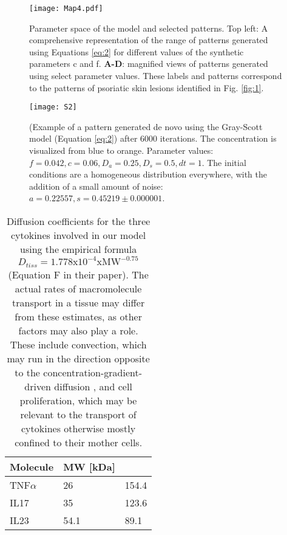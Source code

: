 \begin{figure}[ht]
	\centering
	\texttt{[image: Map4.pdf]}
	\caption[Parameter space of the model and selected patterns]{Parameter space of the model and selected patterns. Top left: A comprehensive representation of the range of patterns generated using Equations \ref{eq:2} for different values of the synthetic parameters c and f. \textbf{A-D}: magnified views of patterns generated using select parameter values. These labels and patterns correspond to the patterns of psoriatic skin lesions identified in Fig. \ref{fig:1}.}
	\label{fig:3}
\end{figure}

\begin{figure}[hb]
  \centering
  \texttt{[image: S2]}
  \caption[Example of a pattern generated de novo using the Gray-Scott model]{(Example of a pattern generated de novo using the Gray-Scott model (Equation \ref{eq:2}) after 6000 iterations. The concentration is visualized from blue to orange. Parameter values: $f=0.042, c=0.06, D_a=0.25, D_s=0.5, dt=1$. The initial conditions are a homogeneous distribution everywhere, with the addition of a small amount of noise: $a=0.22557, s=0.45219±0.000001$.}
  \label{fig:S2}
\end{figure}

\begin{table}[ht]
	\centering
	\begin{tabular}{|l|l|l|}
	\hline
	\textbf{Molecule}  & \textbf{MW [kDa]} & \bm{$D_{tiss}[\mu m^2 / s]$} \\ \hline 
	TNF$\alpha$ & 26   & 154.4 \\ \hline
	IL17        & 35   & 123.6 \\ \hline
	IL23        & 54.1 &  89.1 \\ \hline
	\end{tabular}
	\caption[Diffusion coefficients for the three cytokines involved in our model]{Diffusion coefficients for the three cytokines involved in our model using the empirical formula $D_{tiss}=1.778\text{x}10^{-4}\text{xMW}^{-0.75}$ \citep{swabb1974}(Equation F in their paper). The actual rates of macromolecule transport in a tissue may differ from these estimates, as other factors may also play a role.  These include  convection, which may run in the direction opposite to the concentration-gradient-driven diffusion \citep{swabb1974}, and cell proliferation, which may be relevant to the transport of cytokines otherwise mostly confined to their mother cells.}
	\label{tab:S1}
\end{table}

